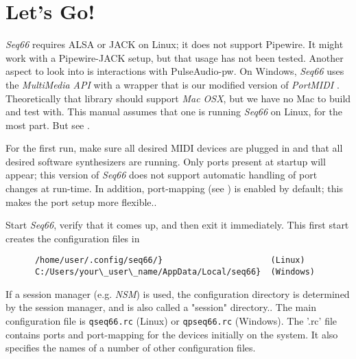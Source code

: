 %
%
%

\section{Let's Go!}
\label{sec:introduction_lets_go}

   \textsl{Seq66} requires ALSA or JACK on Linux;
   it does not support
   Pipewire.
   It might work with a Pipewire-JACK setup, but that usage has not been
   tested.
   Another aspect to look into is interactions with
   PulseAudio-pw.
   On Windows, \textsl{Seq66} uses the \textsl{MultiMedia API} with a wrapper
   that is our modified version of \textsl{PortMIDI} \cite{portmidi}.
   Theoretically that library should support
   \textsl{Mac OSX}, but we have no Mac to build and test with.
   This manual assumes that one is running \textsl{Seq66} on Linux, for the
   most part.
   But see .

   For the first run, make sure all desired MIDI devices are plugged in and
   that all desired software synthesizers are running.
   Only ports present at startup will appear; this version of
   \textsl{Seq66} does not
   support automatic handling of port changes at run-time.
   In addition, port-mapping (see ) is
   enabled by default; this makes the port setup more flexible..

   Start \textsl{Seq66}, verify that it comes up, and then exit it
   immediately.
   This first start creates the configuration files in

   \begin{verbatim}
      /home/user/.config/seq66/}                      (Linux)
      C:/Users/your\_user\_name/AppData/Local/seq66}  (Windows)
   \end{verbatim}

   If a session manager (e.g. \textsl{NSM})
   is used, the configuration directory is determined by
   the session manager, and is also called a "session" directory..
   The main configuration file is
   \texttt{qseq66.rc} (Linux) or
   \texttt{qpseq66.rc} (Windows).
   The '.rc' file contains ports and port-mapping for the devices
   initially on the system.
   It also specifies the names of a number of other configuration files.

